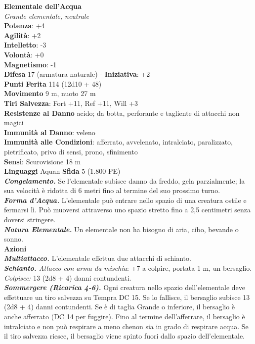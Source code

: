 \begin{multicols}{2}
\medskip\textbf{Elementale dell'Acqua}\\
\emph{Grande elementale, neutrale}\\
\textbf{Potenza}: +4\\
\textbf{Agilità}: +2\\
\textbf{Intelletto}: -3\\
\textbf{Volontà}: +0\\
\textbf{Magnetismo}: -1\\
\textbf{Difesa} 17 (armatura naturale) - \textbf{Iniziativa}: +2\\
\textbf{Punti Ferita} 114 (12d10 + 48)\\
\textbf{Movimento} 9 m, nuoto 27 m\\
\textbf{Tiri Salvezza}: Fort +11, Ref +11, Will +3\\
\textbf{Resistenze al Danno} acido; da botta, perforante e tagliente di attacchi non magici\\
\textbf{Immunità al Danno}: veleno\\
\textbf{Immunità alle Condizioni}: afferrato, avvelenato, intralciato, paralizzato, pietrificato, privo di sensi, prono, sfinimento\\
\textbf{Sensi}: Scurovisione 18 m\\
\textbf{Linguaggi} Aquan
\textbf{Sfida} 5 (1.800 PE)\smallskip\\
\emph{\textbf{Congelamento.}} Se l'elementale subisce danno da freddo, gela parzialmente; la sua velocità è ridotta di 6 metri fino al termine del suo prossimo turno.\\
\emph{\textbf{Forma d'Acqua.}} L'elementale può entrare nello spazio di una creatura ostile e fermarsi lì. Può muoversi attraverso uno spazio stretto fino a 2,5 centimetri senza doversi stringere.\\
\emph{\textbf{Natura Elementale.}} Un elementale non ha bisogno di aria, cibo, bevande o sonno.\\
\smallskip\textbf{Azioni}\\
\emph{\textbf{Multiattacco.}} L'elementale effettua due attacchi di schianto.\\
\emph{\textbf{Schianto.} Attacco con arma da mischia}: +7 a colpire, portata 1 m, un bersaglio.\\
\emph{Colpisce:} 13 (2d8 + 4) danni contundenti.\\
\emph{\textbf{Sommergere (Ricarica 4-6).}} Ogni creatura nello spazio dell'elementale deve effettuare un tiro salvezza su Tempra DC 15. Se lo fallisce, il bersaglio subisce 13 (2d8 + 4) danni contundenti. Se è di taglia Grande o inferiore, il bersaglio è anche afferrato (DC 14 per fuggire). Fino al termine dell'afferrare, il bersaglio è intralciato e non può respirare a meno chenon sia in grado di respirare acqua. Se il  tiro salvezza riesce, il bersaglio viene spinto fuori dallo spazio dell'elementale.\\

\end{multicols}

